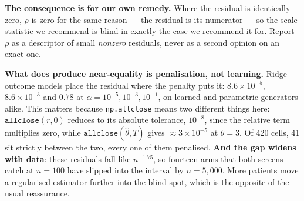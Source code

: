 \textbf{The consequence is for our own remedy.} Where the residual is
identically zero, $\rho$ is zero for the same reason --- the residual is its
numerator --- so the scale statistic we recommend is blind in exactly the case
we recommend it for. Report $\rho$ as a descriptor of small \emph{nonzero}
residuals, never as a second opinion on an exact one.

\textbf{What does produce near-equality is penalisation, not learning.} Ridge
outcome models place the residual where the penalty puts it: $8.6\times10^{-5}$,
$8.6\times10^{-3}$ and $0.78$ at $\alpha = 10^{-5}, 10^{-3}, 10^{-1}$, on
learned and parametric generators alike. This matters because
\texttt{np.allclose} means two different things here:
$\texttt{allclose}(r, 0)$ reduces to its absolute tolerance, $10^{-8}$, since
the relative term multiplies zero, while $\texttt{allclose}(\hat\theta, T)$
gives $\approx 3\times10^{-5}$ at $\theta = 3$. Of 420 cells, 41 sit strictly
between the two, every one of them penalised. \textbf{And the gap widens with
data}: these residuals fall like $n^{-1.75}$, so fourteen arms that both screens
catch at $n = 100$ have slipped into the interval by $n = 5{,}000$. More
patients move a regularised estimator further into the blind spot, which is the
opposite of the usual reassurance.
